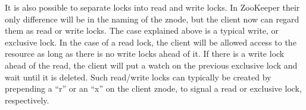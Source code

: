 It is also possible to separate locks into read and write locks. In ZooKeeper their only difference will be in the naming of the znode, but the client now can regard them as read or write locks. The case explained above is a typical write, or exclusive lock. In the case of a read lock, the client will be allowed access to the resource as long as there is no write locks ahead of it. If there is a write lock ahead of the read, the client will put a watch on the previous exclusive lock and wait until it is deleted. Such read/write locks can typically be created by prepending a ``r'' or an ``x'' on the client znode, to signal a read or exclusive lock, respectively.



